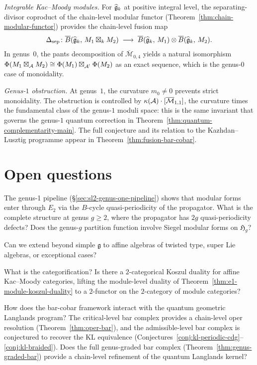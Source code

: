 \emph{Integrable Kac--Moody modules.}
For $\widehat{\mathfrak{g}}_k$ at positive integral level, the
separating-divisor coproduct of the chain-level modular functor
(Theorem~\ref{thm:chain-modular-functor}) provides the
chain-level fusion map
\[
\Delta_{\mathrm{sep}}\colon
\overline{B}(\widehat{\mathfrak{g}}_k,\, M_1 \boxtimes_k M_2)
\;\longrightarrow\;
\overline{B}(\widehat{\mathfrak{g}}_k,\, M_1)
\otimes \overline{B}(\widehat{\mathfrak{g}}_k,\, M_2).
\]
In genus~$0$, the pants decomposition of
$\overline{\mathcal{M}}_{0,4}$ yields a natural isomorphism
$\Phi(M_1 \boxtimes_{\mathcal{A}} M_2)
\cong \Phi(M_1) \boxtimes_{\mathcal{A}^!} \Phi(M_2)$
as an exact sequence, which is the genus-$0$ case of
monoidality.

\emph{Genus-$1$ obstruction.}
At genus~$1$, the curvature $m_0 \neq 0$ prevents strict
monoidality.  The obstruction is controlled by
$\kappa(\mathcal{A}) \cdot [\overline{\mathcal{M}}_{1,1}]$, the
curvature times the fundamental class of the genus-$1$ moduli
space: this is the same invariant that governs the
genus-$1$ quantum correction in
Theorem~\ref{thm:quantum-complementarity-main}.  The full
conjecture and its relation to the Kazhdan--Lusztig programme
appear in Theorem~\ref{thm:fusion-bar-cobar}.

\section{Open questions}

\begin{question}
The genus-1 pipeline (\S\ref{sec:sl2-genus-one-pipeline}) shows that modular forms enter through $E_2$ via the $B$-cycle quasi-periodicity of the propagator.  What is the complete structure at genus $g \geq 2$, where the propagator has $2g$ quasi-periodicity defects?  Does the genus-$g$ partition function involve Siegel modular forms on $\mathfrak{H}_g$?
\end{question}

\begin{question}
Can we extend beyond simple $\mathfrak{g}$ to affine algebras of twisted type, super Lie algebras, or exceptional cases?
\end{question}

\begin{question}
What is the categorification?  Is there a $2$-categorical Koszul
duality for affine Kac--Moody categories, lifting the module-level
duality of Theorem~\ref{thm:e1-module-koszul-duality} to a
$2$-functor on the $2$-category of module categories?
\end{question}

\begin{question}
How does the bar-cobar framework interact with the quantum geometric
Langlands program?  The critical-level bar complex provides a
chain-level oper resolution
(Theorem~\ref{thm:oper-bar}), and the admissible-level bar
complex is conjectured to recover the KL equivalence
(Conjectures~\ref{conj:kl-periodic-cdg}--\ref{conj:kl-braided}).  Does the full genus-graded
bar complex (Theorem~\ref{thm:genus-graded-bar}) provide a
chain-level refinement of the quantum Langlands kernel?
\end{question}
